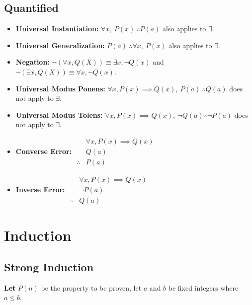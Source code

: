 \documentclass[landscape, letterpaper, 8pt]{extarticle}
\begin{document}
\begin{multicols}{3}
    \subsection*{Quantified}
    \begin{itemize}[noitemsep,nolistsep]
        \item \textbf{Universal Instantiation: } $\forall x,~P(x)~\therefore P(a)$ also applies to $\exists$.
        \item \textbf{Universal Generalization: }$P(a)~\therefore \forall x,~P(x)$ also applies to $\exists$.
        \item \textbf{Negation: }$\neg(\forall x, Q(X)) \equiv \exists x, \neg Q(x)$ and $\neg(\exists x, Q(X)) \equiv \forall x, \neg Q(x)$.
        \item \textbf{Universal Modus Ponens: } $\forall x, P(x)\implies Q(x),~P(a)~\therefore Q(a)$ does not apply to $\exists$.
        \item \textbf{Universal Modus Tolens: } $\forall x, P(x)\implies Q(x),~\neg Q(a) \therefore \neg P(a)$ does not apply to $\exists$.
        \item \textbf{Converse Error: }$ \begin{aligned}
                                 & \forall x, P(x) \implies Q(x) \\
                                 & Q(a)                          \\
                      \therefore & P(a)
                  \end{aligned}$
        \item \textbf{Inverse Error: } $\begin{aligned}
                                 & \forall x, P(x) \implies Q(x) \\
                                 & \neg P(a)                     \\
                      \therefore & Q(a)
                  \end{aligned}$

    \end{itemize}
    \section*{Induction}
    \subsection*{Strong Induction}
    \textbf{Let} $P(n)$ be the property to be proven, let $a$ and $b$ be fixed integers where $a\leq b$.


\end{multicols}
\end{document}
